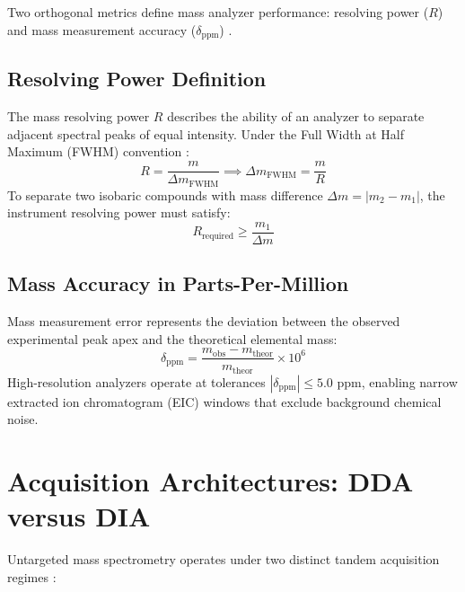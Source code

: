 \documentclass[11pt,twoside,openright]{book}
\begin{document}
Two orthogonal metrics define mass analyzer performance: resolving power ($R$) and mass measurement accuracy ($\delta_{\text{ppm}}$) \cite{zubarev2007persistent, makarov2000orbitrap, marshall1998fourier}.

\subsection{Resolving Power Definition}

The mass resolving power $R$ describes the ability of an analyzer to separate adjacent spectral peaks of equal intensity. Under the Full Width at Half Maximum (FWHM) convention \cite{zubarev2007persistent}:
\begin{equation}
R = \frac{m}{\Delta m_{\text{FWHM}}} \implies \Delta m_{\text{FWHM}} = \frac{m}{R}
\end{equation}
To separate two isobaric compounds with mass difference $\Delta m = |m_2 - m_1|$, the instrument resolving power must satisfy:
\begin{equation}
R_{\text{required}} \ge \frac{m_1}{\Delta m}
\end{equation}

\subsection{Mass Accuracy in Parts-Per-Million}

Mass measurement error represents the deviation between the observed experimental peak apex and the theoretical elemental mass:
\begin{equation}
\delta_{\text{ppm}} = \frac{m_{\text{obs}} - m_{\text{theor}}}{m_{\text{theor}}} \times 10^6
\end{equation}
High-resolution analyzers operate at tolerances $|\delta_{\text{ppm}}| \le 5.0$ ppm, enabling narrow extracted ion chromatogram (EIC) windows that exclude background chemical noise.

\section{Acquisition Architectures: DDA versus DIA}
\label{sec:dda_vs_dia}

Untargeted mass spectrometry operates under two distinct tandem acquisition regimes \cite{domon2010options}:
\end{document}
